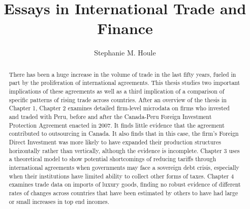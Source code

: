 \documentclass[12pt,twoside]{Mactemplate}
\title{Essays in International Trade and Finance}
\author{Stephanie M. Houle}
\begin{document}
\frontmatter %
  \maketitle


  \begin{abstract}
    There has been a huge increase in the volume of trade in the last fifty
    years, fueled in part by the proliferation of international agreements.
    This thesis studies two important implications of these agreements as
    well as a third implication of a comparison of specific patterns of
    rising trade across countries. After an overview of the thesis in
    Chapter 1, Chapter 2 examines detailed firm-level microdata on firms who
    invested and traded with Peru, before and after the Canada-Peru Foreign
    Investment Protection Agreement enacted in 2007. It finds little
    evidence that the agreement contributed to outsourcing in Canada. It
    also finds that in this case, the firm's Foreign Direct Investment was
    more likely to have expanded their production structures horizontally
    rather than vertically, although the evidence is incomplete. Chapter 3
    uses a theoretical model to show potential shortcomings of reducing
    tariffs through international agreements when governments may face a
    sovereign debt crisis, especially when their institutions have limited
    ability to collect other forms of taxes. Chapter 4 examines trade data
    on imports of luxury goods, finding no robust evidence of different
    rates of changes across countries that have been estimated by others to
    have had large or small increases in top end incomes.
    \thispagestyle{plain}
  \end{abstract}
\end{document}

